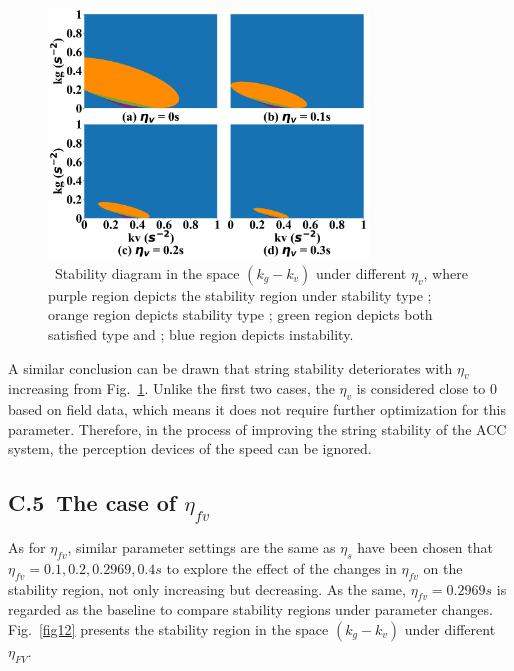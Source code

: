 \documentclass[journal]{IEEEtran}
\begin{document}
\begin{figure}
  \centering
  \includegraphics[width=8.5cm]{figs/fig11.png}
  \caption{~Stability diagram in the space $(k_g-k_v)$ under different $\eta_v$, where purple region depicts the stability region under stability type \uppercase\expandafter{}; orange region depicts stability type \uppercase\expandafter{}; green region depicts both satisfied type \uppercase\expandafter{} and \uppercase\expandafter{}; blue region depicts instability.}
  \label{fig11}
\end{figure}

A similar conclusion can be drawn that string stability deteriorates with $\eta_v$ increasing from Fig.~\ref{fig11}. Unlike the first two cases, the $\eta_v$ is considered close to 0 based on field data, which means it does not require further optimization for this parameter. Therefore, in the process of improving the string stability of the ACC system, the perception devices of the speed can be ignored.

\subsection*{C.5~The case of $\eta_{fv}$}

As for $\eta_{fv}$, similar parameter settings are the same as $\eta_s$ have been chosen that $\eta_{fv}=0.1,0.2,0.2969,0.4s$ to explore the effect of the changes in $\eta_{fv}$ on the stability region, not only increasing but decreasing. As the same, $\eta_{fv}=0.2969s$ is regarded as the baseline to compare stability regions under parameter changes. Fig.~\ref{fig12} presents the stability region in the space $(k_g-k_v)$ under different $\eta_{FV}$.
\end{document}

